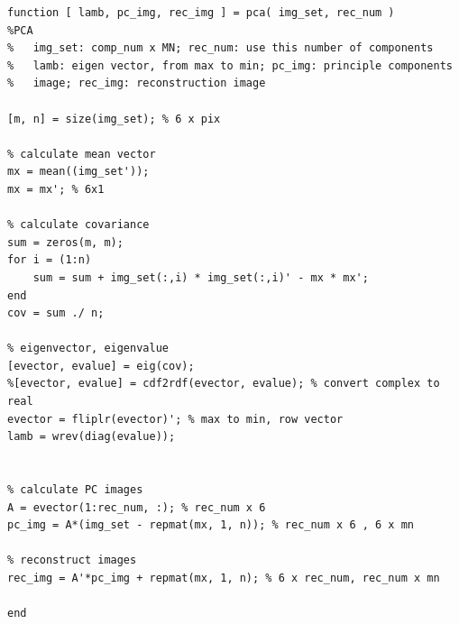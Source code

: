 \lstset{language=Matlab}
\begin{lstlisting}
function [ lamb, pc_img, rec_img ] = pca( img_set, rec_num )
%PCA 
%   img_set: comp_num x MN; rec_num: use this number of components
%   lamb: eigen vector, from max to min; pc_img: principle components
%   image; rec_img: reconstruction image

[m, n] = size(img_set); % 6 x pix

% calculate mean vector
mx = mean((img_set')); 
mx = mx'; % 6x1

% calculate covariance
sum = zeros(m, m);
for i = (1:n)
    sum = sum + img_set(:,i) * img_set(:,i)' - mx * mx';
end
cov = sum ./ n;

% eigenvector, eigenvalue
[evector, evalue] = eig(cov);
%[evector, evalue] = cdf2rdf(evector, evalue); % convert complex to real
evector = fliplr(evector)'; % max to min, row vector
lamb = wrev(diag(evalue));


% calculate PC images
A = evector(1:rec_num, :); % rec_num x 6
pc_img = A*(img_set - repmat(mx, 1, n)); % rec_num x 6 , 6 x mn

% reconstruct images
rec_img = A'*pc_img + repmat(mx, 1, n); % 6 x rec_num, rec_num x mn

end
\end{lstlisting}
